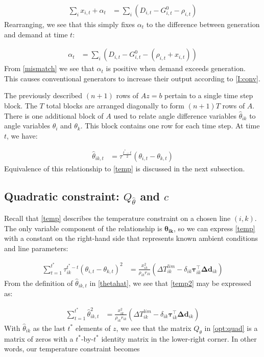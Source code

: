 \documentclass[conference]{IEEEtran}
\begin{document}
\begin{align*}
\sum_i x_{i,t} + \alpha_t &= \sum_i (D_{i,t} - G_{i,t}^0 - \rho_{i,t})
\end{align*}
Rearranging, we see that this simply fixes $\alpha_t$ to the difference between generation and demand at time $t$:

\begin{align}\label{mismatch}
 \alpha_t &= \sum_i \left(D_{i,t} - G_{i,t}^0 - (\rho_{i,t} + x_{i,t})\right)
\end{align}
From \eqref{mismatch} we see that $\alpha_t$ is positive when demand exceeds generation. This causes conventional generators to increase their output according to \eqref{I:conv}.

The previously described $(n+1)$ rows of $Az=b$ pertain to a single time step block. The $T$ total blocks are arranged diagonally to form $(n+1)T$ rows of $A$. There is one additional block of $A$ used to relate angle difference variables $\hat{\theta}_{ik}$ to angle variables $\theta_i$ and $\theta_k$. This block contains one row for each time step. At time $t$, we have:

\begin{align}\label{thetahat}
\hat{\theta}_{ik,t} &= \tau^{\frac{t^*-t}{2}}(\theta_{i,t} - \theta_{k,t})
\end{align}
Equivalence of this relationship to \eqref{temp} is discussed in the next subsection.

\subsection{Quadratic constraint: $Q_{\hat{\theta}}$ and $c$}

Recall that \eqref{temp} describes the temperature constraint on a chosen line $(i,k)$. The only variable component of the relationship is $\boldsymbol{\theta_{ik}}$, so we can express \eqref{temp} with a constant on the right-hand side that represents known ambient conditions and line parameters:

\begin{align}\label{temp2}
\sum_{t=1}^{t^*} \tau_{ik}^{t^*-t} (\theta_{i,t} - \theta_{k,t})^2 &=  \frac{x_{ik}^2}{\rho_{ik} r_{ik}} \left(\Delta T_{ik}^{lim} - \delta_{ik} \boldsymbol{\tau}_{ik}^\top \boldsymbol{\Delta d}_{ik}\right)
\end{align}
From the definition of $\hat{\theta}_{ik,t}$ in \eqref{thetahat}, we see that \eqref{temp2} may be expressed as:

\begin{align}
\sum_{t=1}^{t^*} \hat{\theta}_{ik,t}^2 &=  \frac{x_{ik}^2}{\rho_{ik} r_{ik}} \left(\Delta T_{ik}^{lim} - \delta_{ik} \boldsymbol{\tau}_{ik}^\top \boldsymbol{\Delta d}_{ik}\right)
\end{align}
With $\hat{\theta}_{ik}$ as the last $t^*$ elements of $z$, we see that the matrix $Q_{\theta}$ in \eqref{opt:quad} is a matrix of zeros with a $t^*$-by-$t^*$ identity matrix in the lower-right corner. In other words, our temperature constraint becomes
\end{document}

